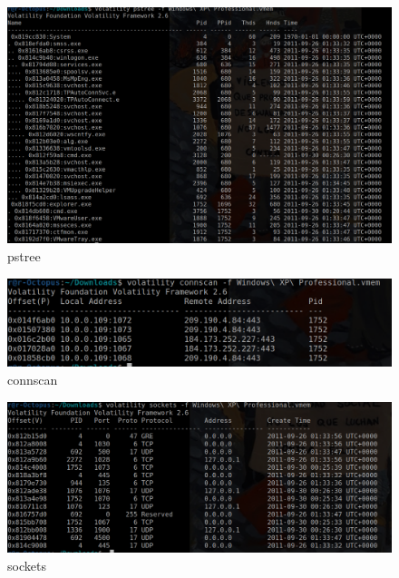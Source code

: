 \documentclass[10pt,a4paper]{article} %
\begin{document}
    \begin{figure}[h!]
        \centering
        \includegraphics[width=1\linewidth]{pstree.png}
        \caption{pstree}
        \label{fig}
    \end{figure}

    \begin{figure}[h!]
        \centering
        \includegraphics[width=0.8\linewidth]{connscan.png}
        \caption{connscan}
        \label{fig}
    \end{figure}

    \begin{figure}[h!]
        \centering
        \includegraphics[width=0.8\linewidth]{sockets.png}
        \caption{sockets}
        \label{fig}
    \end{figure}
\end{document}
